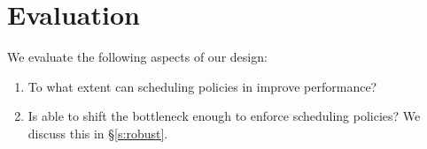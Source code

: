 \section{Evaluation}\label{s:eval}

We evaluate the following aspects of our design:
\begin{enumerate}
    \item To what extent can scheduling policies in \name improve performance?
    \item Is \name able to shift the bottleneck enough to enforce scheduling policies? We discuss this in \S\ref{s:robust}.
\end{enumerate}


